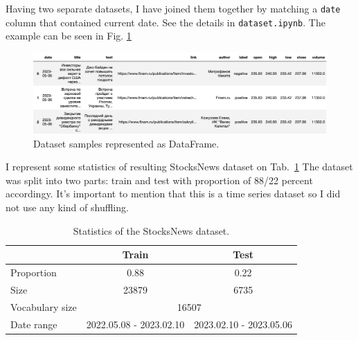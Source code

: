 \documentclass{article}
\begin{document}
Having two separate datasets, I have joined them together by matching a \texttt{date} column that contained current date. 
See the details in \texttt{dataset.ipynb}. The example can be seen in Fig. \ref{fig:dataset}

\begin{figure}[!tbh]
    \centering
    \includegraphics[width=0.9\linewidth]{dataset.png}
    \caption{Dataset samples represented as DataFrame.}
    \label{fig:dataset}
\end{figure}

I represent some statistics of resulting StocksNews dataset on Tab.~\ref{tab:statistics} The dataset was split into two parts: train and test with proportion of 88/22 percent accordingy. It's important to mention that this is a time series dataset so I did not use any kind of shuffling. 

\begin{table}[tbh!]
\begin{center}
\begin{tabular}[t]{|l|c|c|}
\hline
 & Train & Test \\
\hline
\hline
Proportion & 0.88 & 0.22  \\
\hline
Size & 23879 & 6735 \\
\hline
Vocabulary size & \multicolumn{2}{c|}{16507} \\
\hline
Date range & 2022.05.08 - 2023.02.10 & 2023.02.10 - 2023.05.06 \\
\hline
\end{tabular}
\caption{Statistics of the StocksNews dataset.}
\label{tab:statistics}
\end{center}
\end{table}
\end{document}
